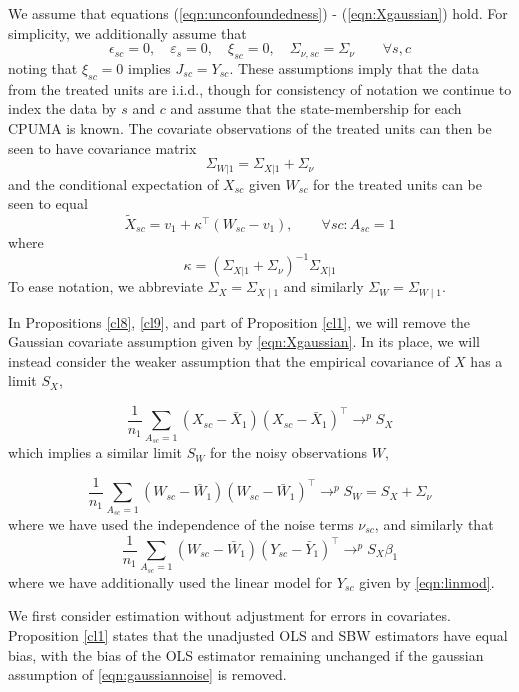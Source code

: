 We assume that equations (\ref{eqn:unconfoundedness}) - (\ref{eqn:Xgaussian}) hold. For simplicity, we additionally assume that
\begin{equation}\label{eqn:simplifications}
\epsilon_{sc} = 0, \quad \varepsilon_s = 0,\quad \xi_{sc} = 0,\quad  \Sigma_{\nu,sc} = \Sigma_\nu \qquad \forall s,c
\end{equation}
noting that $\xi_{sc}=0$ implies $J_{sc} = Y_{sc}$. These assumptions imply that the data from the treated units are i.i.d., though for consistency of notation we continue to index the data by $s$ and $c$ and assume that the state-membership for each CPUMA is known. The covariate observations of the treated units can then be seen to have covariance matrix
\[ \Sigma_{W|1} = \Sigma_{X|1} + \Sigma_\nu\]
and the conditional expectation of $X_{sc}$ given $W_{sc}$ for the treated units can be seen to equal
\[ \tilde{X}_{sc} = v_1 + \kappa^\top (W_{sc} - v_1), \qquad \forall sc: A_{sc}=1\]
where
\[ \kappa = (\Sigma_{X|1} + \Sigma_{\nu})^{-1} \Sigma_{X|1}\]
To ease notation, we abbreviate $\Sigma_X = \Sigma_{X \mid 1}$ and similarly $ \Sigma_W = \Sigma_{W \mid 1}$. 

In Propositions \ref{cl8}, \ref{cl9}, and part of Proposition \ref{cl1}, we will remove the Gaussian covariate assumption given by \eqref{eqn:Xgaussian}. In its place, we will instead consider the weaker assumption that the empirical covariance of $X$ has a limit $S_X$,

\begin{equation}\label{eqn:limitX}
 \frac{1}{n_1} \sum_{A_{sc}=1} (X_{sc} - \bar{X}_1)(X_{sc} - \bar{X}_1)^\top \rightarrow^p S_X
\end{equation}
which implies a similar limit $S_W$ for the noisy observations $W$,

\begin{equation}\label{eqn:limitW}
 \frac{1}{n_1} \sum_{A_{sc}=1} (W_{sc} - \bar{W}_1)(W_{sc} - \bar{W}_1)^\top \rightarrow^p S_W = S_X + \Sigma_{\nu}
\end{equation}
where we have used the independence of the noise terms $\nu_{sc}$, and similarly that 
\begin{equation}\label{eqn:limitWY}
 \frac{1}{n_1} \sum_{A_{sc}=1} (W_{sc} - \bar{W}_1)(Y_{sc} - \bar{Y}_1)^\top \rightarrow^p S_X \beta_1
\end{equation}
where we have additionally used the linear model for $Y_{sc}$ given by \eqref{eqn:linmod}.

We first consider estimation without adjustment for errors in covariates. 
Proposition \ref{cl1} states that the unadjusted OLS and SBW estimators have equal bias, with the bias of the OLS estimator remaining unchanged if the gaussian assumption of \eqref{eqn:gaussiannoise} is removed.


